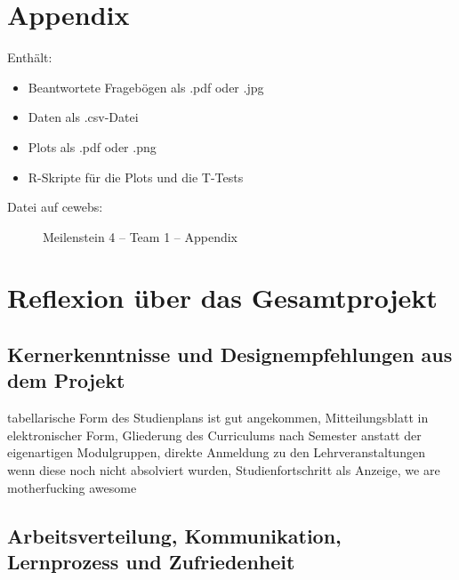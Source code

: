 \documentclass[a4paper,10pt]{scrartcl}
\begin{document}
\section{Appendix}

Enthält:

\begin{itemize}
 \item Beantwortete Fragebögen als .pdf oder .jpg
 \item Daten als .csv-Datei
 \item Plots als .pdf oder .png
 \item R-Skripte für die Plots und die T-Tests
\end{itemize}


\begin{description}
 \item[Datei auf cewebs:] Meilenstein 4 -- Team 1 -- Appendix
\end{description}

\section{Reflexion über das Gesamtprojekt}

\subsection{Kernerkenntnisse und Designempfehlungen aus dem Projekt}

% 

tabellarische Form des Studienplans ist gut angekommen, Mitteilungsblatt in elektronischer Form, Gliederung des Curriculums nach Semester anstatt der eigenartigen
Modulgruppen, direkte Anmeldung zu den Lehrveranstaltungen wenn diese noch nicht absolviert wurden, Studienfortschritt als Anzeige, we are motherfucking awesome

\subsection{Arbeitsverteilung, Kommunikation, Lernprozess und Zufriedenheit}
\end{document}
